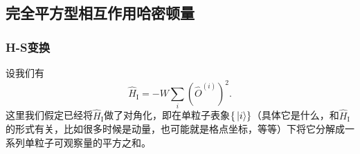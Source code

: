 \documentclass[hyperref, UTF8, a4paper]{ctexart}
\begin{document}
\subsection{完全平方型相互作用哈密顿量}

\subsubsection{H-S变换}

设我们有
\begin{equation}
    \hat{H}_\text{I} = - W \sum_{i} \left( \hat{O}^{(i)} \right)^2.
    \label{eq:two-fermions-hamiltonian}
\end{equation}
这里我们假定已经将$\hat{H}_\text{I}$做了对角化，即在单粒子表象$\{\ket*{i}\}$（具体它是什么，和$\hat{H}_\text{I}$的形式有关，比如很多时候是动量，也可能就是格点坐标，等等）下将它分解成一系列单粒子可观察量的平方之和。
\end{document}
